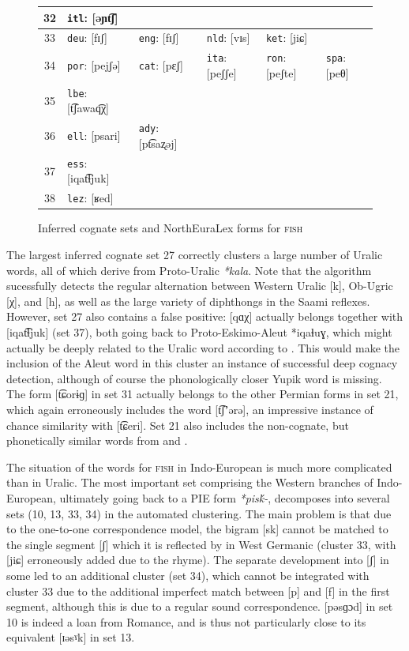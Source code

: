 \begin{figure}[p!]
\begin{tabular}{clllll}
\hline
32 & \texttt{itl}: [əɲt͡ʃ] & & & &\\
\hline
33 & \texttt{deu}: [fɪʃ] & \texttt{eng}: [fɪʃ] & \texttt{nld}: [vɪs] & \texttt{ket}: [jiɕ] &\\
\hline
34 & \texttt{por}: [pejʃə] & \texttt{cat}: [pɛʃ] & \texttt{ita}: [peʃʃe] & \texttt{ron}: [peʃte] & \texttt{spa}: [peθ]\\
\hline
35 & \texttt{lbe}: [t͡ʃawaq͡χ] & & & &\\
\hline
36 & \texttt{ell}: [psari] & \texttt{ady}: [pt͡saʐəj] & & &\\
\hline
37 & \texttt{ess}: [iqat͡ɬjuk] & & & &\\
\hline
38 & \texttt{lez}: [ʁed] & & & &\\
\hline
\end{tabular}
\caption{Inferred cognate sets and NorthEuraLex forms for \textsc{fish}}
\label{cognate-sets-example}
\end{figure}

The largest inferred cognate set 27 correctly clusters a large number of Uralic words, all of which derive from Proto-Uralic \textit{*kala}. Note that the algorithm sucessfully detects the regular alternation between Western Uralic [k], Ob-Ugric [χ], and  [h], as well as the large variety of diphthongs in the Saami reflexes. However, set 27 also contains a false positive:  [qɑχ] actually belongs together with  [iqat͡ɬjuk] (set 37), both going back to Proto-Eskimo-Aleut *iqaɬuɣ, which might actually be deeply related to the Uralic word according to \citet[footnote 51]{fortescue1998}. This would make the inclusion of the Aleut word in this cluster an instance of successful deep cognacy detection, although of course the phonologically closer Yupik word is missing. The  form [t͡ɕorɨɡ] in set 31 actually belongs to the other Permian forms in set 21, which again erroneously includes the  word [t͡ʃʼərə], an impressive instance of chance similarity with  [t͡ɕeri]. Set 21 also includes the non-cognate, but phonetically similar words from  and .

The situation of the words for \textsc{fish} in Indo-European is much more complicated than in Uralic. The most important set comprising the Western branches of Indo-European, ultimately going back to a PIE form \textit{*pis\'{k}-}, decomposes into several sets (10, 13, 33, 34) in the automated clustering. The main problem is that due to the one-to-one correspondence model, the bigram [sk] cannot be matched to the single segment [ʃ] which it is reflected by in West Germanic (cluster 33, with  [jiɕ] erroneously added due to the rhyme). The separate development into [ʃ] in some  led to an additional cluster (set 34), which cannot be integrated with cluster 33 due to the additional imperfect match between [p] and [f] in the first segment, although this is due to a regular sound correspondence.  [pəsɡɔd] in set 10 is indeed a loan from Romance, and is thus not particularly close to its  equivalent [ɪəsˠk] in set 13.

